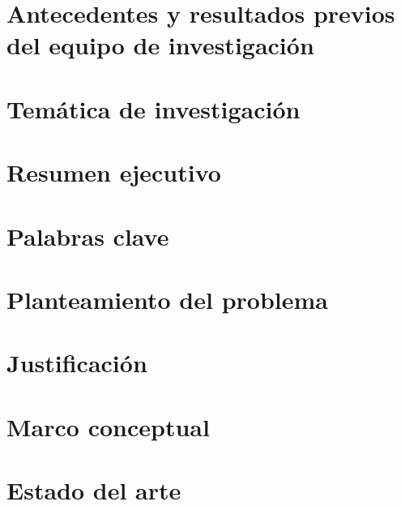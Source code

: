 \documentclass{article}
\begin{document}
\section{Antecedentes y resultados previos del equipo de
  investigaci\'on} 

\section{Tem\'atica de investigaci\'on}

\section{Resumen ejecutivo}


\section{Palabras clave}


\section{Planteamiento del problema}


\section{Justificaci\'on}

\section{Marco conceptual}


\section{Estado del arte}
\end{document}
